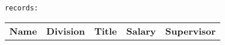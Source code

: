\begin{center}
    \texttt{records:}
    \begin{tabular}{ l l l l l }
        \textbf{Name} & \textbf{Division} & \textbf{Title} & \textbf{Salary} & \textbf{Supervisor}
    \end{tabular}
\end{center}
